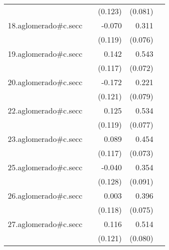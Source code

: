 {\begin{longtable}{l*{4}{D{.}{.}{-1}}}
            &                     &     (0.123)         &     (0.081)         &                     \\
\addlinespace
18.aglomerado#c.secc&                     &      -0.070         &       0.311\sym{***}&                     \\
            &                     &     (0.119)         &     (0.076)         &                     \\
\addlinespace
19.aglomerado#c.secc&                     &       0.142         &       0.543\sym{***}&                     \\
            &                     &     (0.117)         &     (0.072)         &                     \\
\addlinespace
20.aglomerado#c.secc&                     &      -0.172         &       0.221\sym{**} &                     \\
            &                     &     (0.121)         &     (0.079)         &                     \\
\addlinespace
22.aglomerado#c.secc&                     &       0.125         &       0.534\sym{***}&                     \\
            &                     &     (0.119)         &     (0.077)         &                     \\
\addlinespace
23.aglomerado#c.secc&                     &       0.089         &       0.454\sym{***}&                     \\
            &                     &     (0.117)         &     (0.073)         &                     \\
\addlinespace
25.aglomerado#c.secc&                     &      -0.040         &       0.354\sym{***}&                     \\
            &                     &     (0.128)         &     (0.091)         &                     \\
\addlinespace
26.aglomerado#c.secc&                     &       0.003         &       0.396\sym{***}&                     \\
            &                     &     (0.118)         &     (0.075)         &                     \\
\addlinespace
27.aglomerado#c.secc&                     &       0.116         &       0.514\sym{***}&                     \\
            &                     &     (0.121)         &     (0.080)         &                     \\

\end{longtable}}
